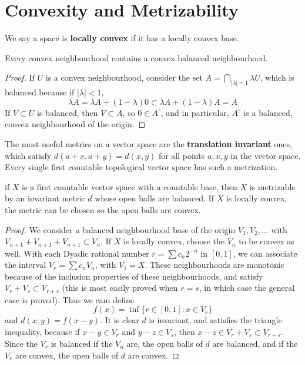 \section{Convexity and Metrizability}

We say a space is {\bf locally convex} if it has a locally convex base.

\begin{theorem}
    Every convex neighbourhood contains a convex balanced neighbourhood.
\end{theorem}
\begin{proof}
    If $U$ is a convex neighbourhood, consider the set $A = \bigcap_{|\lambda| = 1} \lambda U$, which is balanced because if $|\lambda| < 1$,
    \[ \lambda A = \lambda A + (1 - \lambda) 0 \subset \lambda A + (1 - \lambda) A = A \]
    If $V \subset U$ is balanced, then $V \subset A$, so $0 \in A^\circ$, and in particular, $A^\circ$ is a balanced, convex neighbourhood of the origin.
\end{proof}

The most useful metrics on a vector space are the {\bf translation invariant} ones, which satisfy $d(a + x, a + y) = d(x,y)$ for all points $a,x,y$ in the vector space. Every single first countable topological vector space has such a metrization.

\begin{theorem}
    if $X$ is a first countable vector space with a countable base, then $X$ is metrizable by an invariant metric $d$ whose open balls are balanced. If $X$ is locally convex, the metric can be chosen so the open balls are convex.
\end{theorem}
\begin{proof}
    We consider a balanced neighbourhood base of the origin $V_1, V_2, \dots$ with $V_{n+1} + V_{n+1} + V_{n+1} \subset V_n$. If $X$ is locally convex, choose the $V_n$ to be convex as well. With each Dyadic rational number $r = \sum c_n 2^{-n}$ in $[0,1]$, we can associate the interval $V_r = \sum c_n V_n$, with $V_1 = X$. These neighbourhoods are monotonic because of the inclusion properties of these neighbourhoods, and satisfy $V_r + V_s \subset V_{r+s}$ (this is most easily proved when $r = s$, in which case the general case is proved). Thus we cam define
    \[ f(x) = \inf \{ r \in [0,1] : x \in V_r \} \]
    and $d(x,y) = f(x-y)$. It is clear $d$ is invariant, and satisfies the triangle inequality, because if $x - y \in V_r$ and $y - z \in V_s$, then $x - z \in V_r + V_s \subset V_{r + s}$. Since the $V_r$ is balanced if the $V_n$ are, the open balls of $d$ are balanced, and if the $V_r$ are convex, the open balls of $d$ are convex.
\end{proof}


